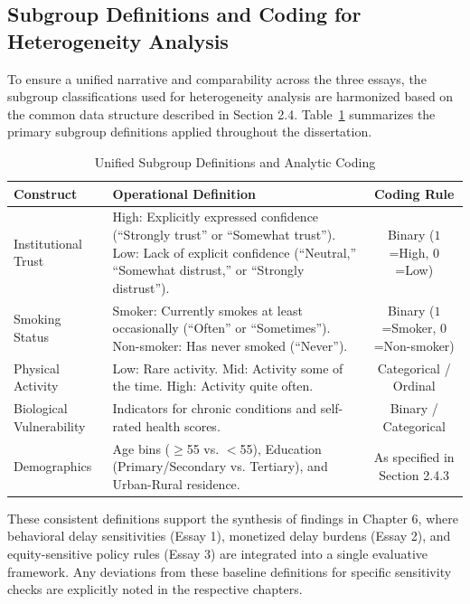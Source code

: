 \subsection{Subgroup Definitions and Coding for Heterogeneity Analysis}
\label{subsec:subgroup_definitions}

To ensure a unified narrative and comparability across the three essays, the subgroup classifications used for heterogeneity analysis are harmonized based on the common data structure described in Section 2.4. Table~\ref{tab:subgroup_coding} summarizes the primary subgroup definitions applied throughout the dissertation.

\begin{table}[h!]
\centering
\small
\caption{Unified Subgroup Definitions and Analytic Coding}
\label{tab:subgroup_coding}
\begin{tabular}{lp{6cm}c}
\toprule
\textbf{Construct} & \textbf{Operational Definition} & \textbf{Coding Rule} \\
\midrule
Institutional Trust & High: Explicitly expressed confidence (``Strongly trust'' or ``Somewhat trust''). \newline Low: Lack of explicit confidence (``Neutral,'' ``Somewhat distrust,'' or ``Strongly distrust''). & Binary ($1$=High, $0$=Low) \\
\addlinespace
Smoking Status & Smoker: Currently smokes at least occasionally (``Often'' or ``Sometimes''). \newline Non-smoker: Has never smoked (``Never''). & Binary ($1$=Smoker, $0$=Non-smoker) \\
\addlinespace
Physical Activity & Low: Rare activity. \newline Mid: Activity some of the time. \newline High: Activity quite often. & Categorical / Ordinal \\
\addlinespace
Biological Vulnerability & Indicators for chronic conditions and self-rated health scores. & Binary / Categorical \\
\addlinespace
Demographics & Age bins ($\geq$55 vs. $<$55), Education (Primary/Secondary vs. Tertiary), and Urban-Rural residence. & As specified in Section 2.4.3 \\
\bottomrule
\end{tabular}
\end{table}

These consistent definitions support the synthesis of findings in Chapter 6, where behavioral delay sensitivities (Essay 1), monetized delay burdens (Essay 2), and equity-sensitive policy rules (Essay 3) are integrated into a single evaluative framework. Any deviations from these baseline definitions for specific sensitivity checks are explicitly noted in the respective chapters.
